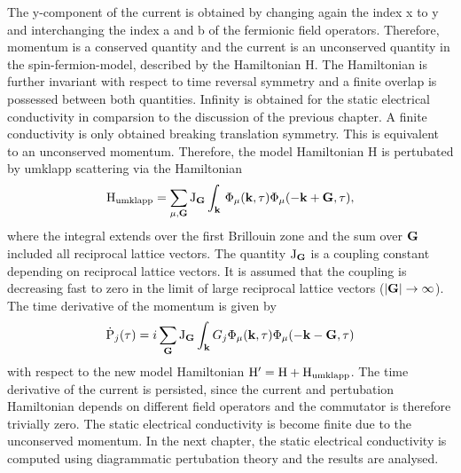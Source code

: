 %
The y-component of the current is obtained by changing again the index x to y and interchanging the index a and b of the fermionic field operators.
Therefore, momentum is a conserved quantity and the current is an unconserved quantity in the spin-fermion-model, described by the Hamiltonian H.
The Hamiltonian is further invariant with respect to time reversal symmetry and a finite overlap is possessed between both quantities.
Infinity is obtained for the static electrical conductivity in comparsion to the discussion of the previous chapter.
A finite conductivity is only obtained breaking translation symmetry.
This is equivalent to an unconserved momentum.
Therefore, the model Hamiltonian H is pertubated by umklapp scattering via the Hamiltonian
%
\begin{align}
	\mathrm{H}_{\mathrm{umklapp}} = \sum\limits_{\mu, \vb{G}} \mathrm{J}_{\vb{G}}
		\int_{\vb{k}}\, \Phi_{\mu}(\vb{k},\tau) \Phi_{\mu}(-\vb{k}+\vb{G},\tau),
	\label{eq:Hamiltonian umklapp scattering}
\end{align}
%
where the integral extends over the first Brillouin zone and the sum over $\vb{G}$ included all reciprocal lattice vectors.
The quantity $\mathrm{J}_{\vb{G}}$ is a coupling constant depending on reciprocal lattice vectors.
It is assumed that the coupling is decreasing fast to zero in the limit of large reciprocal lattice vectors ($|\vb{G}| \to \infty$).
The time derivative of the momentum is given by
%
\begin{align}
	\dot{\mathrm{P}}_{j}(\tau) = i \sum\limits_{\vb{G}} \mathrm{J}_{\vb{G}} \int_{\vb{k}} G_{j} \Phi_{\mu}(\vb{k},\tau) \Phi_{\mu}(-\vb{k} - \vb{G},\tau)
	\label{eq:time derivative momentum finite}
\end{align}
%
with respect to the new model Hamiltonian $\mathrm{H}' = \mathrm{H} + \mathrm{H}_{\mathrm{umklapp}}$.
The time derivative of the current is persisted, since the current and pertubation Hamiltonian depends on different field operators and the commutator is therefore trivially zero.
The static electrical conductivity is become finite due to the unconserved momentum.
In the next chapter, the static electrical conductivity is computed using diagrammatic pertubation theory and the results are analysed.















